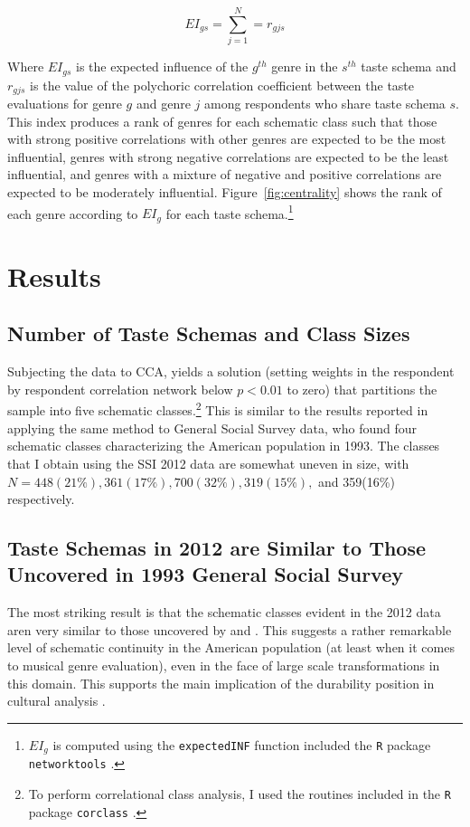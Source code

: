 \documentclass[preprint, authoryear,11pt, 3p]{elsarticle}
\begin{document}
\begin{equation}
EI_{gs} = \sum_{j=1}^{N} = r_{gjs}    
\end{equation}

Where $EI_{gs}$ is the expected influence of the $g^{th}$ genre in the $s^{th}$ taste schema and $r_{gjs}$ is the value of the polychoric correlation coefficient between the taste evaluations for genre $g$ and genre $j$ among respondents who share taste schema $s$. This index produces a rank of genres for each schematic class such that those with strong positive correlations with other genres are expected to be the most influential, genres with strong negative correlations are expected to be the least influential, and genres with a mixture of negative and positive correlations are expected to be moderately influential. Figure~\ref{fig:centrality} shows the rank of each genre according to $EI_g$ for each taste schema.\footnote{$EI_g$ is computed using the \texttt{expectedINF} function included the \texttt{R} package \texttt{networktools} \citep{networktools}.}

\section{Results}
\subsection{Number of Taste Schemas and Class Sizes} 
Subjecting the data to CCA, yields a solution (setting weights in the respondent by respondent correlation network below $p<0.01$ to zero) that partitions the sample into five schematic classes.\footnote{To perform correlational class analysis, I used the routines included in the \texttt{R} package \texttt{corclass} \citep{corclass}.} This is similar to the results reported in \citet{boutyline2017improving} applying the same method to General Social Survey data, who found four schematic classes characterizing the American population in 1993. The classes that I obtain using the SSI 2012 data are somewhat uneven in size, with $N = 448 (21\%), 361 (17\%), 700 (32\%), 319 (15\%),$ and 359(16\%) respectively. 
      
\subsection{Taste Schemas in 2012 are Similar to Those Uncovered in 1993 General Social Survey}
The most striking result is that the schematic classes evident in the 2012 data aren very similar to those uncovered by \citet{goldberg2011mapping} and \citet{boutyline2017improving}. This suggests a rather remarkable level of schematic continuity in the American population (at least when it comes to musical genre evaluation), even in the face of large scale transformations in this domain. This supports the main implication of the durability position in cultural analysis \citep{vaisey2016cultural}. 
\end{document}
